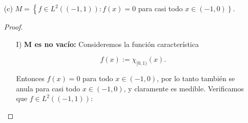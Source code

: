 \begin{itemize}
\begin{proof}
\begin{enumerate}
Como \( 0 \leq \mu(F \cup G) \leq \mu(F) + \mu(G) = 0 \), se sigue que \( F \cup G \) es también de medida nula.

Además, como
\[
(-1,0) \setminus (F \cup G) \subseteq (-1,0) \setminus F \quad \text{y} \quad (-1,0) \setminus (F \cup G) \subseteq (-1,0) \setminus G,
\]
entonces para todo \( x \in (-1,0) \setminus (F \cup G) \),
\[
(f + g)(x) = f(x) + g(x) = 0 + 0 = 0,
\]
es decir, \( f + g \in M \).

Por otro lado, si \( x \in (-1,0) \setminus F \), entonces \( f(x) = 0 \), por lo tanto \( \lambda f(x) = \lambda \cdot 0 = 0 \), así que \( \lambda f \in M \).Concluimos que \( M \) es un subespacio vectorial de \( L^2((-1,1)) \).
\item[IV)] \textbf{Proyección ortogonal sobre \( M \):} Sea \( f \in L^2((-1,1)) \), queremos encontrar \( g \in M \) tal que 
\[
(f - g, h) = 0 \quad \text{para toda } h \in M.
\]
Tomemos \( g = \chi_{[0,1)} f \) y veamos que \( g = P_M f \). Claramente, \( g(x) = 0 \) para todo \( x \in (-1,0) \), por lo cual \( g \in M \).

Sea \( h \in M \), entonces:
\begin{align*}
(f - g, h) &= \int_{-1}^1 \left(f(x) - \chi_{[0,1)}(x) f(x)\right) h(x) \, dx \\
&= \int_{-1}^1 \chi_{(-1,0)}(x) f(x) h(x) \, dx \\
&= \int_{-1}^0 f(x) h(x) \, dx = 0,
\end{align*}
dado que \( h(x) = 0 \) para casi todo \( x \in (-1,0) \), pues \( h \in M \).

Así concluimos que \( g = \chi_{[0,1)} f = P_M f \).



        \end{enumerate}
    \end{proof}


\item[(c)] $M=\left\{f \in L^2((-1,1)): f(x)=0\right.$ para casi todo $\left.x \in(-1,0)\right\}$.
\begin{proof}
        \hfill
        \begin{enumerate}
            \item[I)] \textbf{M es no vacío:} Consideremos la función característica

\[
f(x) := \chi_{[0,1)}(x).
\]

Entonces \( f(x) = 0 \) para todo \( x \in (-1,0) \), por lo tanto también se anula para casi todo \( x \in (-1,0) \), y claramente es medible. Verificamos que \( f \in L^2((-1,1)) \):


\end{enumerate}
\end{proof}
\end{itemize}
